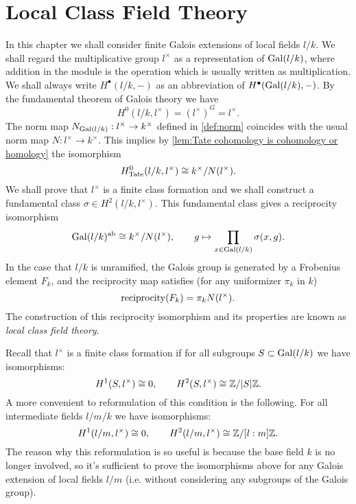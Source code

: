 \chapter{Local Class Field Theory}

In this chapter we shall consider finite Galois extensions of local fields $l/k$.
We shall regard the multiplicative group $l^\times$ as a representation of $\mathrm{Gal}(l/k)$, where
addition in the module is the operation which is usually written as multiplication.
We shall always write $H^\bullet(l/k,-)$ as an abbreviation of $H^\bullet(\mathrm{Gal}(l/k),-)$.
By the fundamental theorem of Galois theory we have
\[
	H^0(l/k,l^\times) = (l^\times)^G = l^\times.
\]
The norm map $N_{\mathrm{Gal}(l/k)} : l^\times \to k^\times$ defined in \ref{def:norm}
coincides with the usual norm map $N : l^\times \to k^\times$. This implies by
\ref{lem:Tate cohomology is cohomology or homology} the isomorphism
\[
	H^0_{\mathrm{Tate}}(l/k,l^\times) \cong k^\times / N(l^\times).
\]
We shall prove that $l^\times$ is a finite class formation and we shall construct a
fundamental class $\sigma \in H^2(l/k, l^\times)$.
This fundamental class gives a reciprocity isomorphism
\[
	\mathrm{Gal}(l/k)^{\mathrm{ab}}
	\cong
	k^\times / N(l^\times), \qquad
	g \mapsto \prod_{x \in \mathrm{Gal}(l/k)} \sigma(x,g).
\]
In the case that $l/k$ is unramified, the Galois group is generated by a Frobenius element $F_k$,
and the reciprocity map satisfies (for any uniformizer $\pi_k$ in $k$)
\[
	\mathrm{reciprocity}(F_k) = \pi_k N(l^\times).
\]
The construction of this reciprocity isomorphism and its properties are known as
\emph{local class field theory}.

Recall that $l^\times$ is a finite class formation if for all subgroups $S \subset \mathrm{Gal}(l/k)$
we have isomorphisms:
\[
	H^1(S,l^\times) \cong 0, \qquad H^2(S,l^\times) \cong {\mathbb Z} / |S| {\mathbb Z}.
\]
A more convenient to reformulation of this condition is the following.
For all intermediate fields $l / m / k$ we have isomorphisms:
\[
	H^1(l/m,l^\times) \cong 0, \qquad H^2(l/m,l^\times) \cong {\mathbb Z} / [l:m] {\mathbb Z}.
\]
The reason why this reformulation is so useful is because the base field $k$ is no longer involved,
so it's sufficient to prove the isomorphisms above for any Galois extension of local fields $l/m$
(i.e. without considering any subgroups of the Galois group).

